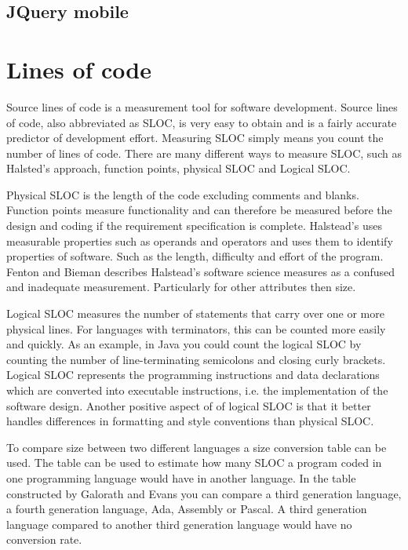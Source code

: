 \subsection{JQuery mobile}

\section{Lines of code}\label{section-lines-of-code}
Source lines of code is a measurement tool for software development. Source lines of code, also abbreviated as SLOC, is very easy to obtain and is a fairly accurate predictor of development effort\cite[p.~63]{galorath2006}. Measuring SLOC simply means you count the number of lines of code. There are many different ways to measure SLOC, such as Halsted’s approach, function points, physical SLOC and Logical SLOC. 

Physical SLOC is the length of the code excluding comments and blanks. Function points measure functionality and can therefore be measured before the design and coding if the requirement specification is complete\cite[p.~187]{galorath2006}. Halstead’s uses measurable properties such as operands and operators and uses them to identify properties of software. Such as the length, difficulty and effort of the program. Fenton and Bieman describes Halstead’s software science measures as a confused and inadequate measurement. Particularly for other attributes then size\cite[p.~345]{fenton2015}.

Logical SLOC measures the number of statements that carry over one or more physical lines.  For languages with terminators, this can be counted more easily and quickly. As an example, in Java you could count the logical SLOC by counting the number of line-terminating semicolons and closing curly brackets. Logical SLOC represents the programming instructions and data declarations which are converted into executable instructions, i.e. the implementation of the software design. Another positive aspect of of logical SLOC is that it better handles differences in formatting and style conventions than physical SLOC\cite[p.~155]{galorath2006}.

To compare size between two different languages a size conversion table can be used. The table can be used to estimate how many SLOC a program coded in one programming language would have in another language. In the table constructed by Galorath and Evans you can compare a third generation language, a fourth generation language, Ada, Assembly or Pascal\cite[p.~163]{galorath2006}. A third generation language compared to another third generation language would have no conversion rate. 

